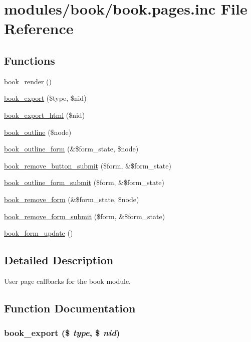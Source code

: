\hypertarget{book_8pages_8inc}{
\section{modules/book/book.pages.inc File Reference}
\label{book_8pages_8inc}
}
\subsection*{Functions}
\begin{CompactItemize}
\item 
\hyperlink{book_8pages_8inc_b9a467483a4cc1909dc16838d6760eea}{book\_\-render} ()
\item 
\hyperlink{book_8pages_8inc_dcfa1ae54cd2673dfedbae459ea573de}{book\_\-export} (\$type, \$nid)
\item 
\hyperlink{book_8pages_8inc_9916aa7ebfa4de8b221ba9e33592bb69}{book\_\-export\_\-html} (\$nid)
\item 
\hyperlink{book_8pages_8inc_13983b7dd1920acb58635a7784c719b1}{book\_\-outline} (\$node)
\item 
\hyperlink{group__forms_g63f60eeeafbddc518906941101553538}{book\_\-outline\_\-form} (\&\$form\_\-state, \$node)
\item 
\hyperlink{book_8pages_8inc_bcf4790efab7bbb44fda88de9ed0847e}{book\_\-remove\_\-button\_\-submit} (\$form, \&\$form\_\-state)
\item 
\hyperlink{book_8pages_8inc_d5f27af5889dbe2ad72df81fd4cd2665}{book\_\-outline\_\-form\_\-submit} (\$form, \&\$form\_\-state)
\item 
\hyperlink{group__forms_g4cd634d95539957d72f2efbe228769f7}{book\_\-remove\_\-form} (\&\$form\_\-state, \$node)
\item 
\hyperlink{book_8pages_8inc_ca2b07a50dae6ef3a271b984dae19c7e}{book\_\-remove\_\-form\_\-submit} (\$form, \&\$form\_\-state)
\item 
\hyperlink{book_8pages_8inc_5f3bce32bdc732757f2a6410bef6ce98}{book\_\-form\_\-update} ()
\end{CompactItemize}


\subsection{Detailed Description}
User page callbacks for the book module. 

\subsection{Function Documentation}
\hypertarget{book_8pages_8inc_dcfa1ae54cd2673dfedbae459ea573de}{
\subsubsection[{book\_\-export}]{\setlength{\rightskip}{0pt plus 5cm}book\_\-export (\$ {\em type}, \/  \$ {\em nid})}}
\label{book_8pages_8inc_dcfa1ae54cd2673dfedbae459ea573de}


